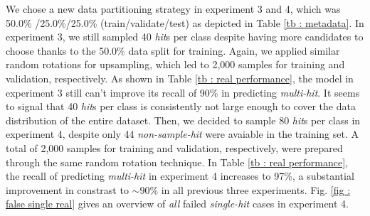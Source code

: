 We chose a new data partitioning strategy in experiment 3 and 4, which was 50.0\%
/25.0\%/25.0\% (train/validate/test) as depicted in Table \ref{tb : metadata}.
In experiment 3, we still sampled 40 \textit{hit}s per class despite having more
candidates to choose thanks to the 50.0\% data split for training.  Again, we
applied similar random rotations for upsampling, which led to 2,000 samples for
training and validation, respectively.  As shown in Table \ref{tb : real
performance}, the model in experiment 3 still can't improve its recall of 90\%
in predicting \textit{multi-hit}.  It seems to signal that 40 \textit{hit}s per
class is consistently not large enough to cover the data distribution of the
entire dataset.  Then, we decided to sample 80 \textit{hit}s per class in
experiment 4, despite only 44 \textit{non-sample-hit} were avaiable in the
training set.  A total of 2,000 samples for training and validation,
respectively, were prepared through the same random rotation technique.  In
Table \ref{tb : real performance}, the recall of predicting \textit{multi-hit}
in experiment 4 increases to 97\%, a substantial improvement in constrast to
$\sim 90\%$ in all previous three experiments.  Fig. \ref{fig : false single
real} gives an overview of \textit{all} failed \textit{single-hit} cases in
experiment 4.



